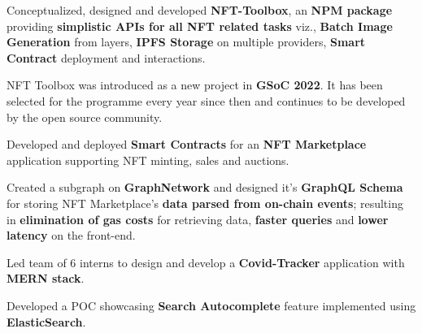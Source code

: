 \documentclass[]{deedy-resume-openfont}
\begin{document}
\begin{tightemize}
\item Conceptualized, designed and developed \textbf{NFT-Toolbox}, an \textbf{NPM package} providing \textbf{simplistic APIs for all NFT related tasks} viz., \textbf{Batch Image Generation} from layers, \textbf{IPFS Storage} on multiple providers, \textbf{Smart Contract} deployment and interactions.
\item NFT Toolbox was introduced as a new project in \textbf{GSoC 2022}. It has been selected for the programme every year since then and continues to be developed by the open source community.
\end{tightemize}
\sectionsep

\begin{tightemize}

\item Developed and deployed \textbf{Smart Contracts} for an \textbf{NFT Marketplace} application supporting NFT minting, sales and auctions.

\item Created a subgraph on \textbf{GraphNetwork} and designed it's \textbf{GraphQL Schema} for storing NFT Marketplace's \textbf{data parsed from on-chain events}; resulting in \textbf{elimination of gas costs} for retrieving data, \textbf{faster queries} and \textbf{lower latency} on the front-end.

\end{tightemize}
\sectionsep

\begin{tightemize}
\item Led team of 6 interns to design and develop a \textbf{Covid-Tracker} application with \textbf{MERN stack}.
\item Developed a POC showcasing \textbf{Search Autocomplete} feature implemented using \textbf{ElasticSearch}.
\end{tightemize}
\sectionsep
\end{document}
